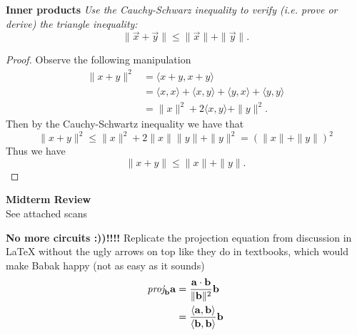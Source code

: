 \documentclass[letter]{article}
\newenvironment{menumerate}{\edef\backupindent{\the\parindent}
  \enumerate\setlength{\parindent}{\backupindent}}
  {\endenumerate}
\begin{document}
\begin{menumerate}
\begin{menumerate}
    \end{menumerate}
    
    \newpage
    \item \textbf{Inner products}
    \emph{Use the Cauchy-Schwarz inequality to verify (i.e. prove or derive) the triangle inequality:}
    \begin{equation*}
        \|\vec{x} + \vec{y}\| \leq \|\vec{x}\| + \|\vec{y}\|.
    \end{equation*}
    \begin{proof}
        Observe the following manipulation 
        \begin{equation*}
        \begin{aligned}
         \|x + y\|^2 &= \langle x + y, x+ y \rangle \\
            &=  \langle x, x \rangle + \langle x, y \rangle  + \langle y, x \rangle  + \langle y, y \rangle  \\
            &= \|x\|^2 + 2\langle x, y \rangle + \|y\|^2.
        \end{aligned}
        \end{equation*}
        Then by the Cauchy-Schwartz inequality we have that 
        \begin{equation*}
            \|x + y\|^2 \leq \|x\|^2 + 2\|x\|\|y\| + \|y\|^2 = (\|x\| + \|y\|)^2
        \end{equation*}
        Thus we have 
        \begin{equation*}
            \|x + y\| \leq \|x\| + \|y\|.
        \end{equation*}
    \end{proof}
    
    
    \newpage
    \item \textbf{Midterm Review}
    \\See attached scans
    
    \newpage
    \item \textbf{No more circuits :))!!!!} Replicate the projection equation from discussion in LaTeX without the ugly arrows on top like they do in textbooks, which would make Babak happy (not as easy as it sounds)\\
    \DeclarePairedDelimiter{\norm}{\lVert}{\rVert}
    \newcommand{\vectorproj}[2][]{\textit{proj}_{\vect{#1}}\vect{#2}}
    \newcommand{\vect}{\mathbf}
    \begin{equation*}
    \begin{aligned}
        \vectorproj[b]{a} &= \frac{\vect{a} \cdot \vect{b}}{\norm{\vect{b}}^2} \vect{b}\\
        &= \frac{\langle\vect{a}, \vect{b}\rangle}{\langle\vect{b}, \vect{b}\rangle} \vect{b}
    \end{aligned}
    \end{equation*}
    

\end{menumerate}
\end{document}
